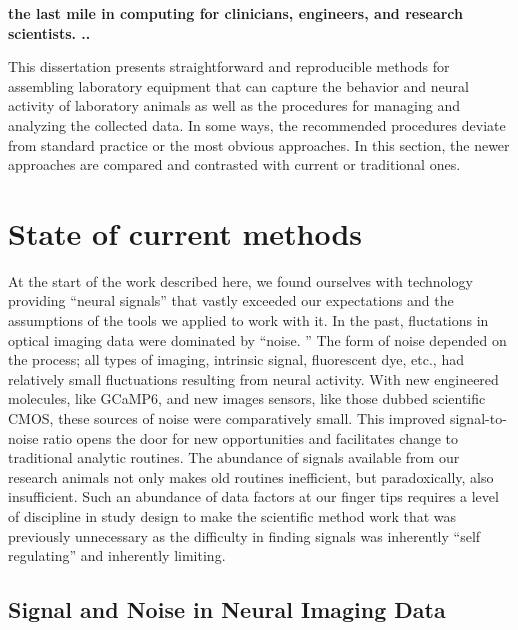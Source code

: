 \documentclass[../main.tex]{subfiles}
\begin{document}
\thispagestyle{myheadings}

\textbf{the last mile in computing for clinicians, engineers, and research scientists.
	..}

This dissertation presents straightforward and reproducible methods for assembling laboratory equipment that can capture the behavior and neural activity of laboratory animals as well as the procedures for managing and analyzing the collected data.
In some ways, the recommended procedures deviate from standard practice or the most obvious approaches.
In this section, the newer approaches are compared and contrasted with current or traditional ones.

\section{
  State of current methods}
\label{state-of-current-methods}

At the start of the work described here, we found ourselves with technology providing “neural signals” that vastly exceeded our expectations and the assumptions of the tools we applied to work with it.
In the past, fluctations in optical imaging data were dominated by “noise.
” The form of noise depended on the process; all types of imaging, intrinsic signal, fluorescent dye, etc., had relatively small fluctuations resulting from neural activity.
With new engineered molecules, like GCaMP6, and new images sensors, like those dubbed scientific CMOS, these sources of noise were comparatively small.
This improved signal-to-noise ratio opens the door for new opportunities and facilitates change to traditional analytic routines.
The abundance of signals available from our research animals not only makes old routines inefficient, but paradoxically, also insufficient.
Such an abundance of data factors at our finger tips requires a level of discipline in study design to make the scientific method work that was previously unnecessary as the difficulty in finding signals was inherently “self regulating” and inherently limiting.

\subsection{
	Signal and Noise in Neural Imaging Data}
\label{signal-and-noise-in-neural-imaging-data}
\end{document}
